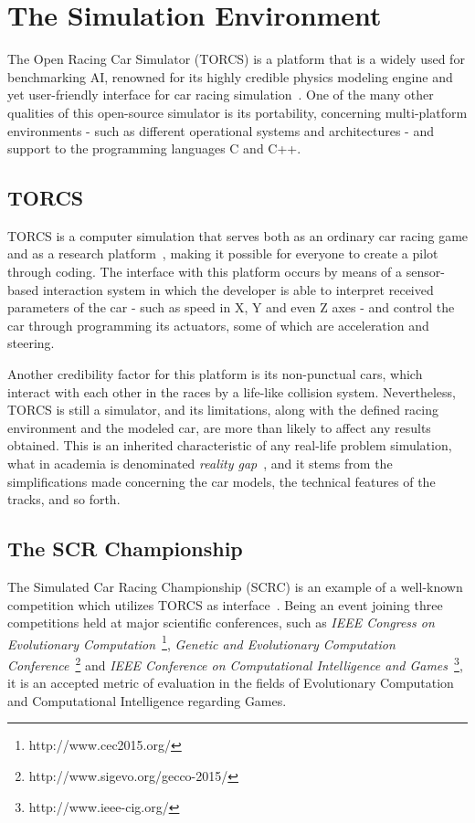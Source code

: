 \section{\textbf{The Simulation Environment}} \label{sec:Environment}

	The Open Racing Car Simulator (TORCS) is a platform that is a widely used for benchmarking AI, renowned for its highly credible physics modeling engine and yet user-friendly interface for car racing simulation~\cite{TORCS}. One of the	many other qualities of this open-source simulator is its portability, concerning multi-platform environments - such as different operational systems and architectures - and support to the programming languages C and C++.

\subsection{TORCS} \label{subsec:TORCS}
	
	TORCS is a computer simulation that serves both as an ordinary car racing game and as a research platform~\cite{2009}, making it possible for everyone to create a pilot through coding. The interface with this platform occurs by means of a sensor-based interaction system in which the developer is able to interpret received parameters of the car - such as speed in X, Y and even Z axes - and control the car through programming its actuators, some of which are acceleration and steering.
	
	Another credibility factor for this platform is its non-punctual cars, which interact with each other in the races by a life-like collision system. Nevertheless, TORCS is still a simulator, and its limitations, along with the defined racing environment and the modeled car, are more than likely to affect any results obtained. This is an inherited characteristic of any real-life problem simulation, what in academia is denominated \emph{reality gap}~\cite{RG}, and it stems from the simplifications made concerning the car models, the technical features of the tracks, and so forth.

\subsection{The SCR Championship} \label{subsec:SCRC}

	The Simulated Car Racing Championship (SCRC) is an example of a well-known competition which utilizes TORCS as interface~\cite{SCR}. Being an event joining three competitions held at major scientific conferences, such as \emph{IEEE Congress on Evolutionary Computation}~\footnote{http://www.cec2015.org/}, \emph{Genetic and Evolutionary Computation Conference}~\footnote{http://www.sigevo.org/gecco-2015/} and \emph{IEEE Conference on Computational Intelligence and Games}~\footnote{http://www.ieee-cig.org/}, it is an accepted metric of evaluation in the fields of Evolutionary Computation and Computational Intelligence regarding Games.
	
